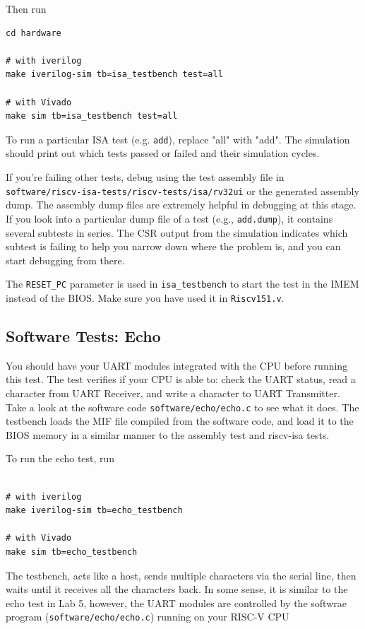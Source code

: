 \documentclass[11pt]{article}
\begin{document}
Then run

\begin{verbatim}
cd hardware

# with iverilog
make iverilog-sim tb=isa_testbench test=all

# with Vivado
make sim tb=isa_testbench test=all
\end{verbatim}

To run a particular ISA test (e.g. \verb|add|), replace "all" with "add". The simulation should print out which tests passed or failed and their simulation cycles.

If you're failing other tests, debug using the test assembly file in\\\verb|software/riscv-isa-tests/riscv-tests/isa/rv32ui| or the generated assembly dump.
The assembly dump files are extremely helpful in debugging at this stage. If you look into a particular dump file of a test (e.g., \verb|add.dump|), it contains several subtests in series. The CSR output from the simulation indicates which subtest is failing to help you narrow down where the problem is, and you can start debugging from there.

The \verb|RESET_PC| parameter is used in \verb|isa_testbench| to start the test in the IMEM instead of the BIOS.
Make sure you have used it in \verb|Riscv151.v|.

\subsection{Software Tests: Echo}

You should have your UART modules integrated with the CPU before running this test. The test verifies if your CPU is able to: check the UART status, read a character from UART Receiver, and write a character to UART Transmitter. Take a look at the software code \verb|software/echo/echo.c| to see what it does. The testbench loads the MIF file compiled from the software code, and load it to the BIOS memory in a similar manner to the assembly test and riscv-isa tests.

To run the echo test, run

\begin{verbatim}

# with iverilog
make iverilog-sim tb=echo_testbench

# with Vivado
make sim tb=echo_testbench
\end{verbatim}

The testbench, acts like a host, sends multiple characters via the serial line, then waits until it receives all the characters back. In some sense, it is similar to the echo test in Lab 5, however, the UART modules are controlled by the softwrae program (\verb|software/echo/echo.c|) running on your RISC-V CPU 
\end{document}
